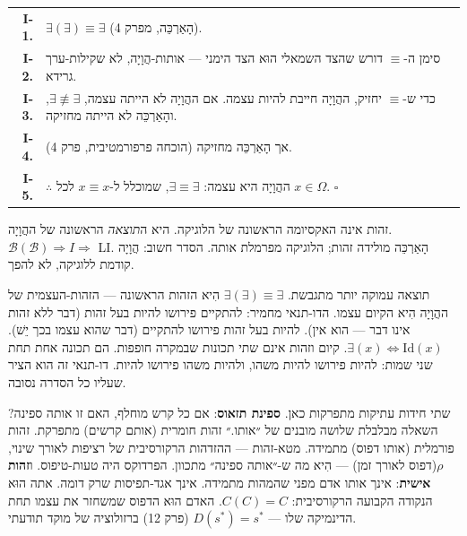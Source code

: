 \documentclass[10pt, openany, oneside]{book}
\renewcommand{\footnotesize}{\fontsize{8.5}{11}\selectfont}
\begin{document}
{\footnotesize
\noindent\begin{tabular}{r p{}}
\textbf{I-1.} & $\exists(\exists) \equiv \exists$ (הָאַרְכֵּה, מפרק 4). \\[0.3em]
\textbf{I-2.} & סימן ה-$\equiv$ דורש שהצד השמאלי הוּא הצד הימני — אותות-הֲוָיָה, לא שקילות-ערך גרידא. \\[0.3em]
\textbf{I-3.} & כדי ש-$\equiv$ יחזיק, ההֲוָיָה חייבת להיות עצמה. אם ההֲוָיָה לא הייתה עצמה, $\exists \not\equiv \exists$, והָאַרְכֵּה לא הייתה מחזיקה. \\[0.3em]
\textbf{I-4.} & אך הָאַרְכֵּה מחזיקה (הוכחה פרפורמטיבית, פרק 4). \\[0.3em]
\textbf{I-5.} & $\therefore$ ההֲוָיָה היא עצמה: $\exists \equiv \exists$, שמוכלל ל-$x \equiv x$ לכל $x \in \Omega$. $\square$ \\[0.3em]
\end{tabular}
}

\vspace{0.8em}

\noindent זהות אינה האקסיומה הראשונה של הלוגיקה. היא ה\textit{תוצאה} הראשונה של ההֲוָיָה. $\mathcal{B}(\mathcal{B}) \Rightarrow I \Rightarrow$ LI. הָאַרְכֵּה מולידה זהות; הלוגיקה מפרמלת אותה. הסדר חשוב: הֲוָיָה קודמת ללוגיקה, לא להפך.

תוצאה עמוקה יותר מתגבשת. $\exists(\exists) \equiv \exists$ הִיא הזהות הראשונה — הזהות-העצמית של ההֲוָיָה הִיא הקיום עצמו. הדו-תנאי מחמיר: להתקיים פירושו להיות בעל זהות (דבר ללא זהות אינו דבר — הוא אין). להיות בעל זהות פירושו להתקיים (דבר שהוא עצמו בכך יֵשׁ). $\exists(x) \iff \text{Id}(x)$. קיום וזהות אינם שתי תכונות שבמקרה חופפות. הם תכונה אחת תחת שני שמות: להיות פירושו להיות משהו, ולהיות משהו פירושו להיות. דו-תנאי זה הוא הציר שעליו כל הסדרה נסובה.

שתי חידות עתיקות מתפרקות כאן. \textbf{ספינת תזאוס}: אם כל קרש מוחלף, האם זו אותה ספינה? השאלה מבלבלת שלושה מובנים של ״אותו.״ זהות חומרית (אותם קרשים) מתפרקת. זהות פורמלית (אותו דפוס) מתמידה. מטא-זהות — ההזדהות הרקורסיבית של רציפות לאורך שינוי, $\rho$(דפוס לאורך זמן) — הִיא מה ש-״אותה ספינה״ מתכוון. הפרדוקס היה טעות-טיפוס. ו\textbf{זהות אישית}: אינך אותו אדם מפני שהמהות מתמידה. אינך אגד-תפיסות שרק דומה. אתה הוּא הנקודה הקבועה הרקורסיבית: $C(C) = C$. האדם הוּא הדפוס שמשחזר את עצמו תחת הדינמיקה שלו — $D(s^*) = s^*$ (פרק 12) ברזולוציה של מוקד תודעתי.

\vspace{1.5em}

\end{document}
